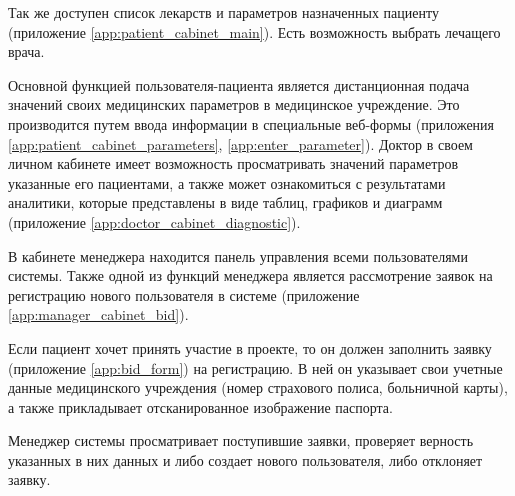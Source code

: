 Так же доступен список лекарств и параметров назначенных пациенту (приложение
\ref{app:patient_cabinet_main}).
Есть возможность выбрать лечащего врача.

Основной функцией пользователя-пациента является дистанционная подача  значений
своих медицинских параметров в медицинское учреждение. Это производится путем
ввода информации в специальные веб-формы (приложения
\ref{app:patient_cabinet_parameters}, \ref{app:enter_parameter}). Доктор в своем личном
кабинете имеет возможность просматривать значений параметров указанные его пациентами, а также
может ознакомиться с результатами аналитики, которые представлены в виде таблиц,
графиков и диаграмм (приложение \ref{app:doctor_cabinet_diagnostic}).

В кабинете менеджера находится панель управления всеми пользователями системы.
Также одной из функций менеджера является рассмотрение заявок на регистрацию
нового пользователя в системе (приложение \ref{app:manager_cabinet_bid}).

Если пациент хочет принять участие в проекте, то он должен заполнить заявку
(приложение \ref{app:bid_form}) на регистрацию. В ней он указывает свои учетные
данные медицинского учреждения (номер страхового полиса, больничной карты), а
также прикладывает отсканированное изображение паспорта.

Менеджер системы просматривает поступившие заявки, проверяет верность указанных
в них данных и либо создает нового пользователя, либо отклоняет заявку.